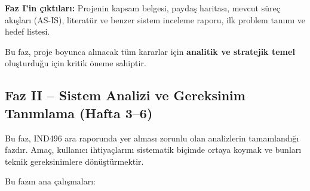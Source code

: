 \documentclass[a4paper,12pt]{report}
\begin{document}
\textbf{Faz I'in çıktıları:} Projenin kapsam belgesi, paydaş haritası, mevcut süreç akışları (AS-IS), literatür ve benzer sistem inceleme raporu, ilk problem tanımı ve hedef listesi.

Bu faz, proje boyunca alınacak tüm kararlar için \textbf{analitik ve stratejik temel} oluşturduğu için kritik öneme sahiptir.

\subsection{Faz II – Sistem Analizi ve Gereksinim Tanımlama (Hafta 3–6)}

Bu faz, IND496 ara raporunda yer alması zorunlu olan analizlerin tamamlandığı fazdır. Amaç, kullanıcı ihtiyaçlarını sistematik biçimde ortaya koymak ve bunları teknik gereksinimlere dönüştürmektir.

Bu fazın ana çalışmaları:
\end{document}
